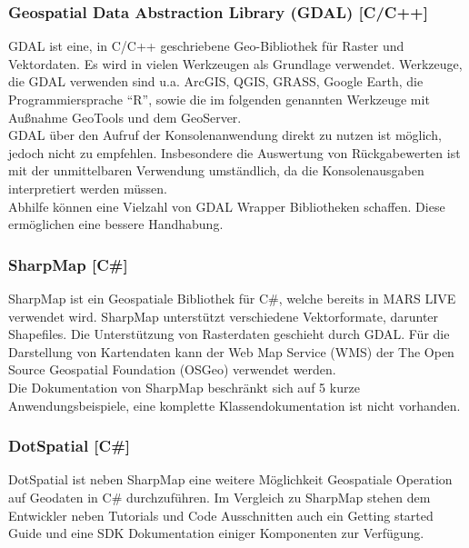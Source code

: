 \documentclass[10pt,conference,compsocconf]{IEEEtran}
\begin{document}
\subsubsection{Geospatial Data Abstraction Library (GDAL) [C/C++]}
GDAL ist eine, in C/C++ geschriebene Geo-Bibliothek für Raster und Vektordaten. Es wird in vielen Werkzeugen als Grundlage verwendet. Werkzeuge, die GDAL verwenden sind u.a. ArcGIS, QGIS, GRASS, Google Earth, die Programmiersprache \enquote{R}, sowie die im folgenden genannten Werkzeuge mit Außnahme GeoTools und dem GeoServer.\\
GDAL über den Aufruf der Konsolenanwendung direkt zu nutzen ist möglich, jedoch nicht zu empfehlen. Insbesondere die Auswertung von Rückgabewerten ist mit der unmittelbaren Verwendung umständlich, da die Konsolenausgaben interpretiert werden müssen.\\
Abhilfe können eine Vielzahl von GDAL Wrapper Bibliotheken schaffen. Diese ermöglichen eine bessere Handhabung.\\

\subsubsection{SharpMap [C\#]}
SharpMap ist ein Geospatiale Bibliothek für C\#, welche bereits in MARS LIVE verwendet wird. SharpMap unterstützt verschiedene Vektorformate, darunter Shapefiles. Die Unterstützung von Rasterdaten geschieht durch GDAL. Für die Darstellung von Kartendaten kann der Web Map Service (WMS) der The Open Source Geospatial Foundation (OSGeo) verwendet werden.\\
Die Dokumentation von SharpMap beschränkt sich auf 5 kurze Anwendungsbeispiele, eine komplette Klassendokumentation ist nicht vorhanden.\\
	
\subsubsection{DotSpatial [C\#]}
DotSpatial ist neben SharpMap eine weitere Möglichkeit Geospatiale Operation auf Geodaten in C\# durchzuführen. Im Vergleich zu SharpMap stehen dem Entwickler neben Tutorials und Code Ausschnitten auch ein Getting started Guide und eine SDK Dokumentation einiger Komponenten zur Verfügung.\\
	
\end{document}
